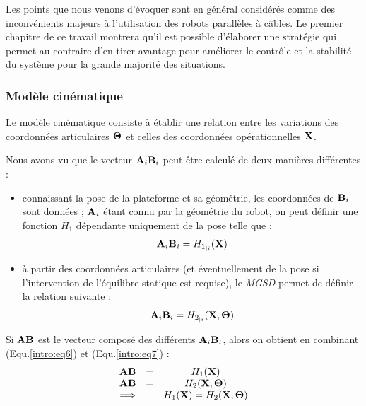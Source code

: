 Les points que nous venons d'évoquer sont en général considérés comme des inconvénients majeurs à l'utilisation des robots parallèles à câbles. Le premier chapitre de ce travail montrera qu'il est possible d'élaborer une stratégie qui permet au contraire d'en tirer avantage pour améliorer le contrôle et la stabilité du système pour la grande majorité des situations.

\subsubsection{Modèle cinématique}

Le modèle cinématique consiste à établir une relation entre les variations des coordonnées articulaires ${\bf \Theta}$ et celles des coordonnées opérationnelles ${\bf X}$.

Nous avons vu que le vecteur ${\bf A}_i{\bf B}_i$ peut être calculé de deux manières différentes :
\begin{itemize}
 \item connaissant la pose de la plateforme et sa géométrie, les coordonnées de ${\bf B}_i$ sont données ; ${\bf A}_i$ étant connu par la géométrie du robot, on peut définir une fonction $H_1$ dépendante uniquement de la pose telle que :
\begin{equation}
{\bf A}_i{\bf B}_i = H_{1_{|i}}({\bf X})
\label{intro:eq6}
\end{equation}
 \item à partir des coordonnées articulaires (et éventuellement de la pose si l'intervention de l'équilibre statique est requise), le {\it MGSD} permet de définir la relation suivante :
\begin{equation}
{\bf A}_i{\bf B}_i = H_{2_{|i}}({\bf X}, {\bf \Theta})
\label{intro:eq7}
\end{equation}
\end{itemize}
 
Si ${\bf AB}$ est le vecteur composé des différents ${\bf A}_i{\bf B}_i$, alors on obtient en combinant (Equ.\ref{intro:eq6}) et (Equ.\ref{intro:eq7}) :
\begin{equation}
\begin{matrix}
{\bf AB} &=& H_1({\bf X}) \\
{\bf AB} &=& H_2({\bf X}, {\bf \Theta}) \\
\Longrightarrow & & H_1({\bf X}) = H_2({\bf X}, {\bf \Theta})
\end{matrix}
\label{intro:eq8}
\end{equation}

